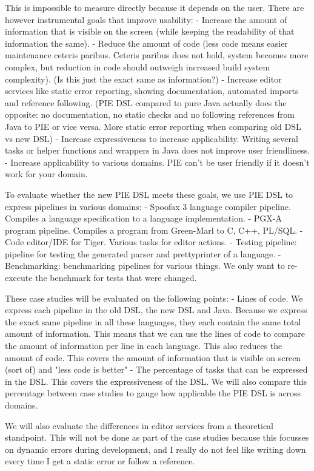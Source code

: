 This is impossible to measure directly because it depends on the user.
There are however instrumental goals that improve usability:
- Increase the amount of information that is visible on the screen (while keeping the readability of that information the same).
- Reduce the amount of code (less code means easier maintenance ceteris paribus. Ceteris paribus does not hold, system becomes more complex, but reduction in code should outweigh increased build system complexity). (Is this just the exact same as information?)
- Increase editor services like static error reporting, showing documentation, automated imports and reference following. (PIE DSL compared to pure Java actually does the opposite: no documentation, no static checks and no following references from Java to PIE or vice versa. More static error reporting when comparing old DSL vs new DSL)
- Increase expressiveness to increase applicability. Writing several tasks or helper functions and wrappers in Java does not improve user friendliness.
- Increase applicability to various domains. PIE can't be user friendly if it doesn't work for your domain.

To evaluate whether the new PIE DSL meets these goals, we use PIE DSL to express pipelines in various domains:
- Spoofax 3 language compiler pipeline. Compiles a language specification to a language implementation.
- PGX-A program pipeline. Compiles a program from Green-Marl to C, C++, PL/SQL.
- Code editor/IDE for Tiger. Various tasks for editor actions.
- Testing pipeline: pipeline for testing the generated parser and prettyprinter of a language.
- Benchmarking: benchmarking pipelines for various things. We only want to re-execute the benchmark for tests that were changed.

These case studies will be evaluated on the following points:
- Lines of code. We express each pipeline in the old DSL, the new DSL and Java. Because we express the exact same pipeline in all these languages, they each contain the same total amount of information. This means that we can use the lines of code to compare the amount of information per line in each language. This also reduces the amount of code.
This covers the amount of information that is visible on screen (sort of) and "less code is better"
- The percentage of tasks that can be expressed in the DSL.
This covers the expressiveness of the DSL. We will also compare this percentage between case studies to gauge how applicable the PIE DSL is across domains.

We will also evaluate the differences in editor services from a theoretical standpoint. This will not be done as part of the case studies because this focusses on dynamic errors during development, and I really do not feel like writing down every time I get a static error or follow a reference.





